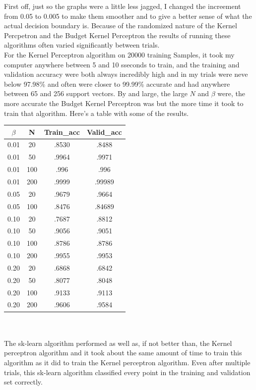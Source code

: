 \documentclass[submit]{harvardml}
\begin{document}
\begin{enumerate}
	First off, just so the graphs were a little less jagged, I changed the increement from 0.05 to 0.005 to make them smoother and to give a better sense of what the actual decision boundary is. Because of the randomized nature of the Kernel Percpetron and the Budget Kernel Perceptron the results of running these algorithms often varied significantly between trials.  \\
	For the Kernel Perceptron algorithm on 20000 training Samples, it took my computer anywhere between 5 and 10 sseconds to train, and the training and validation accuracy were both always incredibly high and in my trials were neve below 97.98\% and often were closer to 99.99\% accurate and had anywhere between 65 and 256 support vectors. By and large, the large $N$ and $\beta$ were, the more accurate the Budget Kernel Perceptron was but the more time it took to train that algorithm.  Here's a table with some of the results.   \\
	\begin{tabular}{c | c | c | c}
		 $\beta$ &  N &  Train\_acc &  Valid\_acc  \\ 
		 \hline
		 0.01 &  20 &  .8530 &  .8488  \\ 
		 0.01 &  50 &  .9964 &  .9971  \\ 
		 0.01 &  100 &  .996 &  .996  \\ 
		 0.01 &  200 &  .9999 &  .99989  \\ 
		 0.05 &  20 &  .9679 &  .9664  \\ 
		 0.05 &  100 &  .8476 &  .84689  \\ 
		 0.10 &  20 &  .7687 &  .8812  \\ 
		 0.10 &  50 &  .9056 &  .9051  \\ 
		 0.10 &  100 &  .8786 &  .8786  \\ 
		 0.10 &  200 &  .9955 &  .9953  \\ 
		 0.20 &  20 &  .6868 &  .6842  \\ 
		 0.20 &  50 &  .8077 &  .8048  \\ 
		 0.20 &  100 &  .9133 &  .9113  \\ 
		 0.20 &  200  &  .9606 &  .9584  \\ 
	\end{tabular} \\\\
	The sk-learn algorithm performed as well as, if not better than, the Kernel perceptron algorithm and it took about the same amount of time to train this algorithm as it did to train the Kernel perceptron algorithm. Even after multiple trials, this sk-learn algorithm classified every point in the training and validation set correctly.  

\end{enumerate}
\end{document}
